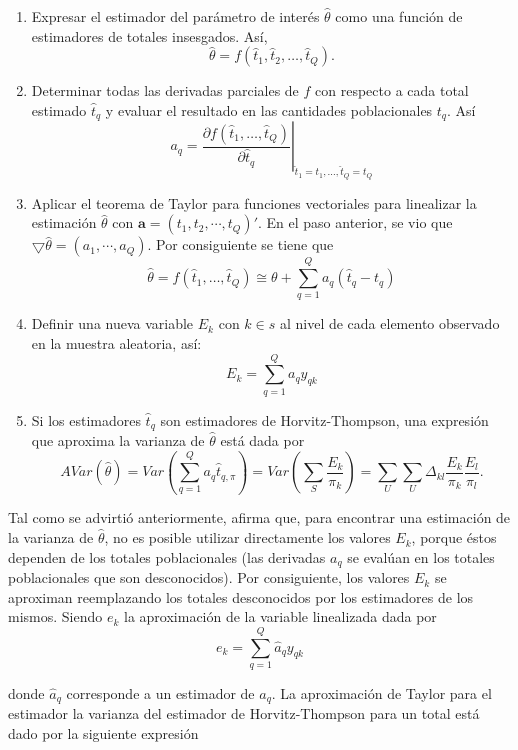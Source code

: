 \documentclass[
  12pt,
  spanish,
]{book}
\providecommand{\tightlist}{%
  \setlength{\itemsep}{0pt}\setlength{\parskip}{0pt}}
\begin{document}
\begin{enumerate}
\def\labelenumi{\arabic{enumi}.}
\tightlist
\item
  Expresar el estimador del parámetro de interés \(\hat{\theta}\) como una función de estimadores de totales insesgados. Así,
  \[
  \hat{\theta}=f(\hat{t}_1, \hat{t}_2,\ldots,\hat{t}_Q).
  \]
\item
  Determinar todas las derivadas parciales de \(f\) con respecto a cada total estimado \(\hat{t}_{q}\) y evaluar el resultado en las cantidades poblacionales \(t_q\). Así
  \[
  a_q=\left.\dfrac{\partial f(\hat{t}_1,\ldots,\hat{t}_Q)}{\partial \hat{t}_{q}}\right|_{\hat{t}_1=t_1,\ldots,\hat{t}_Q=t_Q}
  \]
\item
  Aplicar el teorema de Taylor para funciones vectoriales para linealizar la estimación \(\hat{\theta}\) con \(\mathbf{a}=(t_1,t_2,\cdots,t_Q)'\). En el paso anterior, se vio que \(\bigtriangledown\hat{\theta}=(a_1,\cdots,a_Q)\). Por consiguiente se tiene que
  \[
  \hat{\theta}=f(\hat{t}_1,\ldots,\hat{t}_Q) \cong \theta +\sum_{q=1}^Qa_q(\hat{t}_{q}-t_q)
  \]
\item
  Definir una nueva variable \(E_k\) con \(k\in s\) al nivel de cada elemento observado en la muestra aleatoria, así:
  \[
  E_k=\sum_{q=1}^Qa_qy_{qk}
  \]
\item
  Si los estimadores \(\hat{t}_{q}\) son estimadores de Horvitz-Thompson, una expresión que aproxima la varianza de \(\hat{\theta}\) está dada por
  \[
  AVar(\hat{\theta})=Var\left(\sum_{q=1}^Qa_q\hat{t}_{q,\pi}\right)
  =Var\left(\sum_S\frac{E_k}{\pi_k}\right)=\sum_U\sum_U\Delta_{kl}\frac{E_k}{\pi_k}\frac{E_l}{\pi_l}.
  \]
\end{enumerate}

Tal como se advirtió anteriormente, \citet{Gutierrez_2016} afirma que, para encontrar una estimación de la varianza de \(\hat{\theta}\), no es posible utilizar directamente los valores \(E_k\), porque éstos dependen de los totales poblacionales (las derivadas \(a_q\) se evalúan en los totales poblacionales que son desconocidos). Por consiguiente, los valores \(E_k\) se aproximan reemplazando los totales desconocidos por los estimadores de los mismos. Siendo \(e_k\) la aproximación de la variable linealizada dada por
\[
e_k=\sum_{q=1}^Q\hat{a}_qy_{qk}
\]

donde \(\hat{a}_q\) corresponde a un estimador de \(a_q\). La aproximación de Taylor para el estimador la varianza del estimador de Horvitz-Thompson para un total está dado por la siguiente expresión
\end{document}
